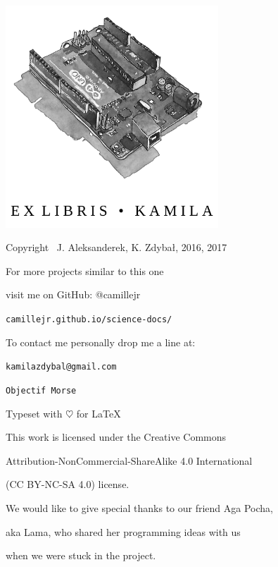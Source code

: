 \documentclass[10pt]{report}
\begin{document}

\thispagestyle{empty}
\begin{center}
    
\vspace*{4cm}

\includegraphics[width = 80mm]{ex_libris_arduino.png}

\vspace*{2cm}

Copyright \textcopyright \, J. Aleksanderek, K. Zdybał, 2016, 2017

For more projects similar to this one

visit me on GitHub: @camillejr

\verb|camillejr.github.io/science-docs/|

To contact me personally drop me a line at:

\verb|kamilazdybal@gmail.com|

\vspace*{2cm}

\verb|Objectif Morse|

Typeset with $\heartsuit$ for \LaTeX

\vspace*{1.8cm}

\noindent This work is licensed under the Creative Commons

Attribution-NonCommercial-ShareAlike 4.0 International 

(CC BY-NC-SA
4.0) license.

\end{center}
\newpage

\setlength{\parskip}{1em}
\renewcommand{\baselinestretch}{1.0}

\thispagestyle{empty}
\begin{center}
    
\vspace*{2.5cm}

{\selectfont
We would like to give special thanks to our friend Aga Pocha,

aka Lama, who shared her programming ideas with us 

when we were stuck in the project.

}
\vspace*{2cm}

\end{center}
\end{document}
